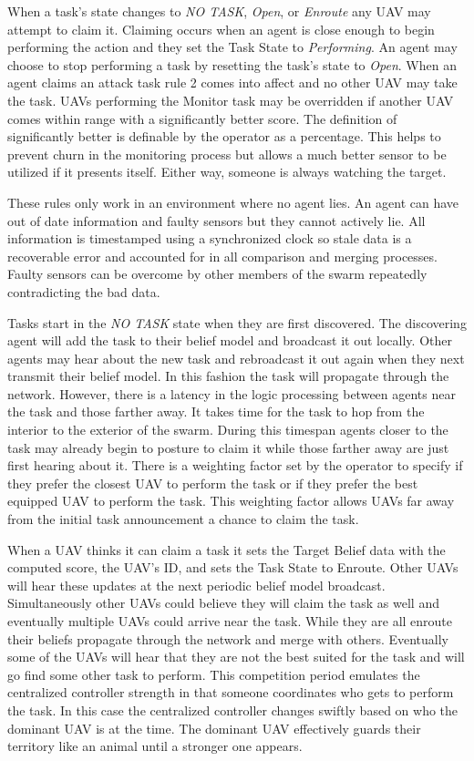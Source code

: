 When a task's state changes to \textit{NO TASK}, \textit{Open}, or \textit{Enroute} any UAV may attempt to claim it.  Claiming occurs when an agent is close enough to begin performing the action and they set the Task State to \textit{Performing}.  An agent may choose to stop performing a task by resetting the task's state to \textit{Open}.  When an agent claims an attack task rule 2 comes into affect and no other UAV may take the task.  UAVs performing the Monitor task may be overridden if another UAV comes within range with a significantly better score.  The definition of significantly better is definable by the operator as a percentage.   This helps to prevent churn in the monitoring process but allows a much better sensor to be utilized if it presents itself.  Either way, someone is always watching the target.

These rules only work in an environment where no agent lies.  An agent can have out of date information and faulty sensors but they cannot actively lie.  All information is timestamped using a synchronized clock so stale data is a recoverable error and accounted for in all comparison and merging processes.  Faulty sensors can be overcome by other members of the swarm repeatedly contradicting the bad data.

Tasks start in the \textit{NO TASK} state when they are first discovered.  The discovering agent will add the task to their belief model and broadcast it out locally.  Other agents may hear about the new task and rebroadcast it out again when they next transmit their belief model.  In this fashion the task will propagate through the network.  However, there is a latency in the logic processing between agents near the task and those farther away.  It takes time for the task to hop from the interior to the exterior of the swarm.  During this timespan agents closer to the task may already begin to posture to claim it while those farther away are just first hearing about it.  There is a weighting factor set by the operator to specify if they prefer the closest UAV to perform the task or if they prefer the best equipped UAV to perform the task.  This weighting factor allows UAVs far away from the initial task announcement a chance to claim the task.

When a UAV thinks it can claim a task it sets the Target Belief data with the computed score, the UAV's ID, and sets the Task State to Enroute.  Other UAVs will hear these updates at the next periodic belief model broadcast.  Simultaneously other UAVs could believe they will claim the task as well and eventually multiple UAVs could arrive near the task.  While they are all enroute their beliefs propagate through the network and merge with others.  Eventually some of the UAVs will hear that they are not the best suited for the task and will go find some other task to perform.  This competition period emulates the centralized controller strength in that someone coordinates who gets to perform the task.  In this case the centralized controller changes swiftly based on who the dominant UAV is at the time.  The dominant UAV effectively guards their territory like an animal until a stronger one appears.

